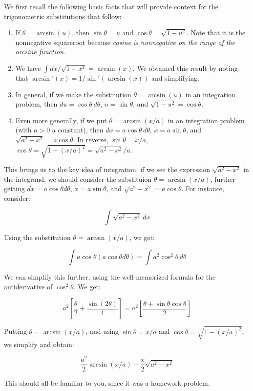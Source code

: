 \documentclass[10pt]{amsart}
\begin{document}
We first recall the following basic facts that will provide context
for the trigonometric substitutions that follow:

\begin{enumerate}
\item If $\theta = \arcsin(u)$, then $\sin \theta = u$ and $\cos
  \theta = \sqrt{1 - u^2}$. Note that it is the nonnegative squareroot
  because {\em cosine is nonnegative on the range of the arcsine
  function}.
\item We have $\int dx/\sqrt{1 - x^2} = \arcsin(x)$. We obtained this
  result by noting that $\arcsin'(x) = 1/\sin'(\arcsin(x))$ and
  simplifying.
\item In general, if we make the substitution $\theta = \arcsin(u)$ in
  an integration problem, then $du = \cos \theta \, d\theta$, $u = \sin
  \theta$, and $\sqrt{1 - u^2} = \cos \theta$.
\item Even more generally, if we put $\theta = \arcsin(x/a)$ in an
  integration problem (with $a > 0$ a constant), then $dx = a \cos
  \theta \, d\theta$, $x = a \sin \theta$, and $\sqrt{a^2 - x^2} = a \cos
  \theta$. In reverse, $\sin \theta = x/a$, $\cos \theta = \sqrt{1 -
  (x/a)^2} = \sqrt{a^2 - x^2}/a$.
\end{enumerate}

This brings us to the key idea of integration: if we see the
expression $\sqrt{a^2 - x^2}$ in the integrand, we should consider the
substituion $\theta = \arcsin(x/a)$, further getting $dx = a \cos
\theta d\theta$, $x = a \sin \theta$, and $\sqrt{a^2 - x^2} = a\cos
\theta$. For instance, consider:

$$\int \sqrt{a^2 - x^2} \, dx$$

Using the substitution $\theta = \arcsin(x/a)$, we get:

$$\int a \cos \theta (a \cos \theta d \theta) = \int a^2 \cos^2 \theta \, d\theta$$

We can simplify this further, using the well-memorized formula for the
antiderivative of $\cos^2\theta$. We get:

$$a^2\left[\frac{\theta}{2} + \frac{\sin(2\theta)}{4} \right] = a^2\left[\frac{\theta + \sin \theta \cos \theta}{2}\right]$$

Putting $\theta = \arcsin(x/a)$, and using $\sin \theta = x/a$ and
$\cos \theta = \sqrt{1 - (x/a)^2}$, we simplify and obtain:

$$\frac{a^2}{2} \arcsin(x/a) + \frac{x}{2} \sqrt{a^2 - x^2}$$

This should all be familiar to you, since it was a homework problem.
\end{document}
